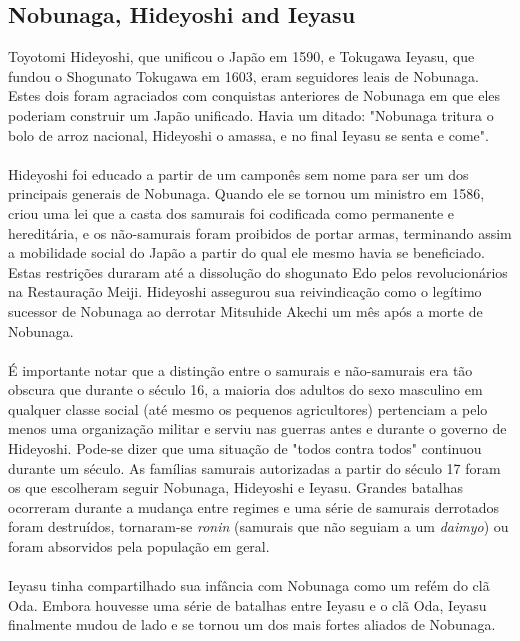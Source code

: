 \documentclass[12pt, a4paper]{article}
\begin{document}
		\subsection{Nobunaga, Hideyoshi and Ieyasu}
			Toyotomi Hideyoshi, que unificou o Japão em 1590, e Tokugawa Ieyasu, que fundou o Shogunato Tokugawa em 1603, eram seguidores leais de Nobunaga. Estes dois foram agraciados com conquistas anteriores de Nobunaga em que eles poderiam construir um Japão unificado. Havia um ditado: "Nobunaga tritura o bolo de arroz nacional, Hideyoshi o amassa, e no final Ieyasu se senta e come".\\
			\\
			\indent Hideyoshi foi educado a partir de um camponês sem nome para ser um dos principais generais de Nobunaga. Quando ele se tornou um ministro em 1586, criou uma lei que a casta dos samurais foi codificada como permanente e hereditária, e os não-samurais foram proibidos de portar armas, terminando assim a mobilidade social do Japão a partir do qual ele mesmo havia se beneficiado. Estas restrições duraram até a dissolução do shogunato Edo pelos revolucionários na Restauração Meiji. Hideyoshi assegurou sua reivindicação como o legítimo sucessor de Nobunaga ao derrotar Mitsuhide Akechi um mês após a morte de Nobunaga.\\
			\\
			\indent É importante notar que a distinção entre o samurais e não-samurais era tão obscura que durante o século 16, a maioria dos adultos do sexo masculino em qualquer classe social (até mesmo os pequenos agricultores) pertenciam a pelo menos uma organização militar e serviu nas guerras antes e durante o governo de Hideyoshi. Pode-se dizer que uma situação de "todos contra todos" continuou durante um século. As famílias samurais autorizadas a partir do século 17 foram os que escolheram seguir Nobunaga, Hideyoshi e Ieyasu. Grandes batalhas ocorreram durante a mudança entre regimes e uma série de samurais derrotados foram destruídos, tornaram-se \textit{ronin} (samurais que não seguiam a um \textit{daimyo}) ou foram absorvidos pela população em geral.\\
			\\
			\indent Ieyasu tinha compartilhado sua infância com Nobunaga como um refém do clã Oda. Embora houvesse uma série de batalhas entre Ieyasu e o clã Oda, Ieyasu finalmente mudou de lado e se tornou um dos mais fortes aliados de Nobunaga.\\
    \newpage
\end{document}
